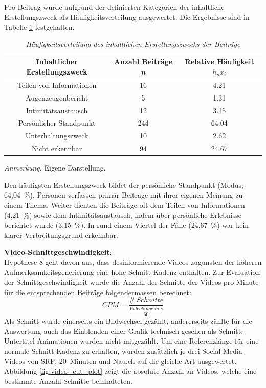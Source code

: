 \documentclass[12pt,a4paper]{article}        %
\begin{document}
Pro Beitrag wurde aufgrund der definierten Kategorien der inhaltliche Erstellungszweck als Häufigkeitsverteilung ausgewertet. Die Ergebnisse sind in Tabelle \ref{tab:results_content_creation_purpose} festgehalten.

\begin{table}
  \centering
  \caption{\textit{Häufigkeitsverteilung des inhaltlichen Erstellungszwecks der Beiträge}}
  \label{tab:results_content_creation_purpose}
  \begin{tabular}{|c|c|c|}\hline
    \textbf{Inhaltlicher Erstellungszweck}&  \textbf{Anzahl Beiträge \textit{n}}& \textbf{Relative Häufigkeit \({h_n}{x_i}\)}\\\hline
    Teilen von Informationen&  16& 4.21\\\hline
    Augenzeugenbericht&  5& 1.31\\\hline
    Intimitätsaustausch&  12& 3.15\\\hline
    Persönlicher Standpunkt&  244& 64.04\\\hline
    Unterhaltungszweck&  10& 2.62\\\hline
    Nicht erkennbar&  94& 24.67\\ \hline
  \end{tabular}
  \footnotesize\textit{Anmerkung.} Eigene Darstellung.
\end{table}
Den häufigsten Erstellungszweck bildet der persönliche Standpunkt (Modus; 64,04 \%). Personen verfassen primär Beiträge mit ihrer eigenen Meinung zu einem Thema. Weiter dienten die Beiträge oft dem Teilen von Informationen (4,21 \%) sowie dem Intimitätsaustausch, indem über persönliche Erlebnisse berichtet wurde (3,15 \%). In rund einem Viertel der Fälle  (24,67 \%) war kein klarer Verbreitungsgrund erkennbar.

\pagebreak
\textbf{Video-Schnittgeschwindigkeit}:\\
Hypothese 8 geht davon aus, dass desinformierende Videos zugunsten der höheren Aufmerksamkeitsgenerierung eine hohe Schnitt-Kadenz enthalten.
Zur Evaluation der Schnittgeschwindigkeit wurde die Anzahl der Schnitte der Videos pro Minute für die entsprechenden Beiträge folgendermassen berechnet:
\[CPM  = \frac{\# \ Schnitte}{\frac{Videolänge\ in\ s}{60}}\]
Als Schnitt wurde einerseits ein Bildwechsel gezählt, andererseits zählte für die Auswertung auch das Einblenden einer Grafik technisch gesehen als Schnitt. Untertitel-Animationen wurden nicht mitgezählt.
Um eine Referenzlänge für eine normale Schnitt-Kadenz zu erhalten, wurden zusätzlich je drei Social-Media-Videos von SRF, 20 Minuten und Nau.ch auf die gleiche Art ausgewertet.
Abbildung \ref{fig:video_cut_plot} zeigt die absolute Anzahl an Videos, welche eine bestimmte Anzahl Schnitte beinhalteten.
\end{document}
